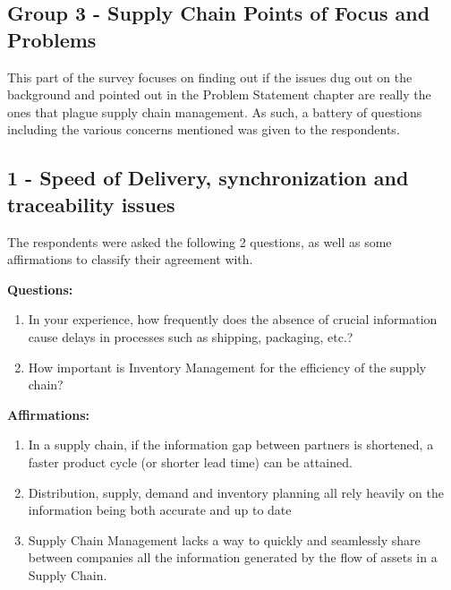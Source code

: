 
\subsection{Group 3 - Supply Chain Points of Focus and Problems}
\label{sec-supplychainissues}
This part of the survey focuses on finding out if the issues dug out on the background and pointed out in the Problem Statement chapter are really the ones that plague supply chain management. As such, a battery of questions including the various concerns mentioned was given to the respondents.

\subsection*{1 - Speed of Delivery, synchronization and traceability issues}

The respondents were asked the following 2 questions, as well as some affirmations to classify their agreement with.

\par\textbf{Questions:}
\begin{enumerate}
  \item In your experience, how frequently does the absence of crucial information cause delays in processes such as shipping, packaging, etc.?
  \item How important is Inventory Management for the efficiency of the supply chain?
\end{enumerate}

\par\textbf{Affirmations:}
\begin{enumerate}

\item In a supply chain, if the information gap between partners is shortened, a faster product cycle (or shorter lead time) can be attained.
\item Distribution, supply, demand and inventory planning all rely heavily on the information being both accurate and up to date

\item Supply Chain Management lacks a way to quickly and seamlessly share between companies all the information generated by the flow of assets in a Supply Chain.
\end{enumerate}

